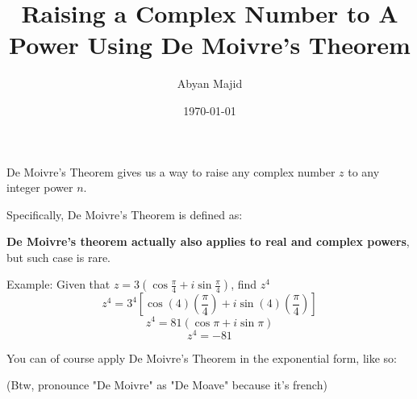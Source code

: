 \documentclass{article}
\begin{document}
\title{Raising a Complex Number to A Power Using De Moivre's Theorem}
\author{Abyan Majid}
\date{\today}
\maketitle
\begin{center}
De Moivre's Theorem gives us a way to raise any complex number $z$ to any integer power $n$.

    Specifically, De Moivre's Theorem is defined as:\\

\vspace{\baselineskip}

\noindent \textbf{De Moivre's theorem actually also applies to real and complex powers}, but such case is rare.

\vspace{\baselineskip}

\noindent Example: Given that $z=3(\cos\frac{\pi}{4}+i\sin\frac{\pi}{4})$, find $z^4$
    $$z^4=3^4[\cos(4)(\frac{\pi}{4})+i\sin(4)(\frac{\pi}{4})]$$
    $$z^4=81(\cos\pi+i\sin\pi)$$
    $$z^4=-81$$



You can of course apply De Moivre's Theorem in the exponential form, like so: 

\vspace{\baselineskip}

\noindent(Btw, pronounce "De Moivre" as "De Moave" because it's french)

\end{center}
\end{document}
